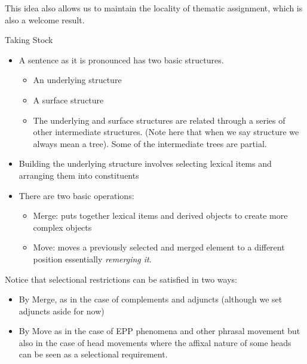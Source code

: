 \begin{frame}
  This idea also allows us to maintain the locality of thematic assignment, which is also a welcome result.
\end{frame}



\begin{frame}
  {Taking Stock}

  \begin{itemize}
  \item A sentence as it is pronounced has two basic structures.
    \begin{itemize}
    \item An underlying structure
    \item A surface structure
    \item The underlying and surface structures are related through a series of other intermediate structures.  (Note here that when we say structure we always mean a tree).  Some of the intermediate trees are partial.
    \end{itemize}
\item  Building the underlying structure involves selecting lexical items and arranging them into constituents
\item There are two basic operations:
  \begin{itemize}
  \item Merge: puts together lexical items and derived objects to create more complex objects
  \item Move: moves a previously selected and merged element to a different position essentially \textit{remerging it}.
  \end{itemize}

  \end{itemize}

\end{frame}

\begin{frame}
  Notice that selectional restrictions can be satisfied in two ways:

  \begin{itemize}
  \item By Merge, as in the case of complements and adjuncts (although we set adjuncts aside for now)
  \item By Move as in the case of EPP phenomena and other phrasal movement but also in the case of head movements where the affixal nature of some heads can be seen as a selectional requirement.
  \end{itemize}
\end{frame}



